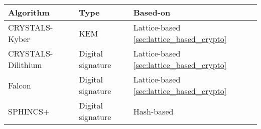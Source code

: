 \begin{tabular}{|l|l|l|}
  \hline
  Algorithm & Type & Based-on \\
  \hline
  CRYSTALS-Kyber & KEM & Lattice-based \ref{sec:lattice_based_crypto}\\
  CRYSTALS-Dilithium & Digital signature & Lattice-based \ref{sec:lattice_based_crypto}\\
  Falcon & Digital signature & Lattice-based \ref{sec:lattice_based_crypto}\\
  SPHINCS+ & Digital signature & Hash-based \\
  \hline
\end{tabular}